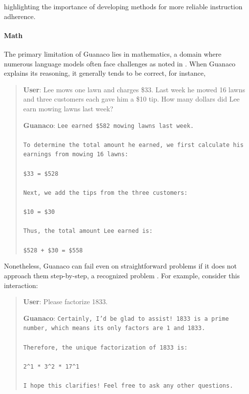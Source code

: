 highlighting the importance of developing methods for more reliable instruction adherence.

\paragraph{Math} The primary limitation of {Guanaco} lies in mathematics, a domain where numerous language models often face challenges as noted in \citep{liang2022holistic}. When {Guanaco} explains its reasoning, it generally tends to be correct, for instance,

\begin{quote}
    \textbf{User}: Lee mows one lawn and charges \$33. Last week he mowed 16 lawns and three customers each gave him a \$10 tip. How many dollars did Lee earn mowing lawns last week?

    \textbf{Guanaco}: \texttt{Lee earned \$582 mowing lawns last week. \\ \\ To determine the total amount he earned, we first calculate his earnings from mowing 16 lawns: \\ \\  \$33  = \$528 \\ \\ Next, we add the tips from the three customers: \\  \\ \$10  = \$30 \\ \\ Thus, the total amount Lee earned is: \\ \\ \$528 + \$30 = \$558}
\end{quote}

Nonetheless, {Guanaco} can fail even on straightforward problems if it does not approach them step-by-step, a recognized problem \cite{weichain}. For example, consider this interaction:

\begin{quote}
    \textbf{User}: Please factorize 1833.

    \textbf{Guanaco}: \texttt{Certainly, I’d be glad to assist! 1833 is a prime number, which means its only factors are 1 and 1833. \\ \\ Therefore, the unique factorization of 1833 is: \\ \\ 2\^{}1 * 3\^{}2 * 17\^{}1 \\ \\ I hope this clarifies! Feel free to ask any other questions.}
\end{quote}

